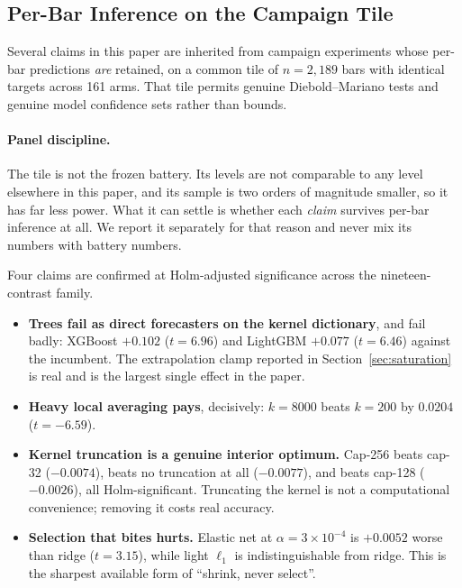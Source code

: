 \subsection{Per-Bar Inference on the Campaign Tile}
\label{sec:tile_inference}

Several claims in this paper are inherited from campaign experiments whose
per-bar predictions \emph{are} retained, on a common tile of $n = 2{,}189$ bars
with identical targets across 161 arms. That tile permits genuine
Diebold--Mariano tests and genuine model confidence sets rather than bounds.

\paragraph{Panel discipline.} The tile is not the frozen battery. Its levels are
not comparable to any level elsewhere in this paper, and its sample is two
orders of magnitude smaller, so it has far less power. What it can settle is
whether each \emph{claim} survives per-bar inference at all. We report it
separately for that reason and never mix its numbers with battery numbers.



Four claims are confirmed at Holm-adjusted significance across the
nineteen-contrast family.

\begin{itemize}
  \item \textbf{Trees fail as direct forecasters on the kernel dictionary}, and
    fail badly: XGBoost $+0.102$ ($t = 6.96$) and LightGBM $+0.077$
    ($t = 6.46$) against the incumbent. The extrapolation clamp reported in
    Section~\ref{sec:saturation} is real and is the largest single effect in
    the paper.
  \item \textbf{Heavy local averaging pays}, decisively: $k = 8000$ beats
    $k = 200$ by $0.0204$ ($t = -6.59$).
  \item \textbf{Kernel truncation is a genuine interior optimum.} Cap-256 beats
    cap-32 ($-0.0074$), beats no truncation at all ($-0.0077$), and beats
    cap-128 ($-0.0026$), all Holm-significant. Truncating the kernel is not a
    computational convenience; removing it costs real accuracy.
  \item \textbf{Selection that bites hurts.} Elastic net at $\alpha = 3\times
    10^{-4}$ is $+0.0052$ worse than ridge ($t = 3.15$), while light $\ell_1$
    is indistinguishable from ridge. This is the sharpest available form of
    ``shrink, never select''.
\end{itemize}

